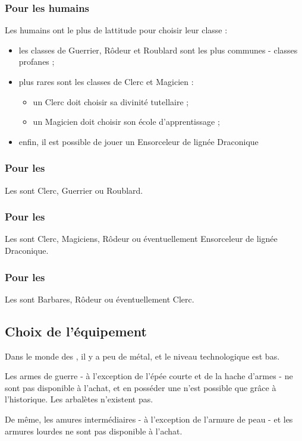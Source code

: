 \documentclass[a4paper,10pt,openany]{book}
\begin{document}
\begin{multicols}{2}
\subsubsection{Pour les humains}
Les \PJs humains ont le plus de lattitude pour choisir leur classe :
\begin{itemize}
  \item les classes de Guerrier, Rôdeur et Roublard sont les plus communes - classes profanes ;
  \item plus rares sont les classes de Clerc et Magicien :
  \begin{itemize}
    \item un \PJ Clerc doit choisir sa divinité tutellaire ;
    \item un \PJ Magicien doit choisir son école d’apprentissage ; 
  \end{itemize}
  \item enfin, il est possible de jouer un Ensorceleur de lignée Draconique
\end{itemize}

\subsubsection{Pour les \Nains}
Les \PJs \Nains sont Clerc, Guerrier ou Roublard.

\subsubsection{Pour les \Elfes}
Les \PJs \Elfes sont Clerc, Magiciens, Rôdeur ou éventuellement Ensorceleur de lignée Draconique.

\subsubsection{Pour les \DemiOrcs}
Les \PJs \DemiOrcs sont Barbares, Rôdeur ou éventuellement Clerc.

\subsection{Choix de l’équipement}
Dans le monde des \Royaumes, il y a peu de métal, et le niveau technologique est bas.\par Les armes de guerre - à l’exception de l’épée
courte et de la hache d’armes - ne sont pas disponible à l’achat, et en posséder une n’est possible que grâce à l’historique. Les arbalètes
n’existent pas.\par De même, les amures intermédiaires - à l’exception de l’armure de peau - et les armures lourdes ne sont pas disponible à l’achat.

\end{multicols}
\end{document}
